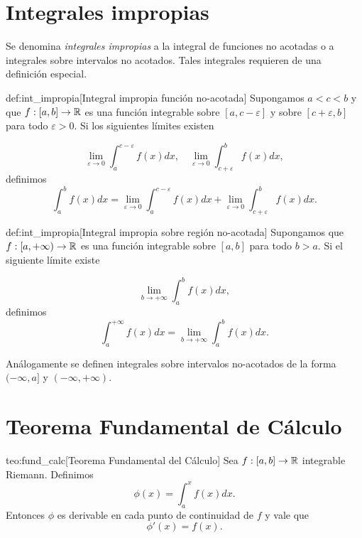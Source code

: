    
\section{Integrales impropias}
Se denomina \emph{integrales impropias} a la integral de funciones no acotadas o a integrales sobre intervalos no acotados. Tales integrales requieren de una definición especial.
\begin{definicion}{def:int_impropia}[Integral impropia función no-acotada] Supongamos $a<c<b$ y que $f:[a,b]\to\mathbb{R}$ es una función integrable sobre $[a,c-\varepsilon]$ y sobre $[c+\varepsilon,b]$ para todo $\varepsilon>0$. Si los siguientes límites existen

\[
 \lim_{\varepsilon\to 0}\int_a^{c-\varepsilon}f(x)dx,\quad \lim_{\varepsilon\to 0}\int_{c+\varepsilon}^bf(x)dx,
\]
definimos 
\begin{equation}\label{eq:int_impro}
 \int_a^bf(x)dx= \lim_{\varepsilon\to 0}\int_a^{c-\varepsilon}f(x)dx+ \lim_{\varepsilon\to 0}\int_{c+\varepsilon}^bf(x)dx.
\end{equation}



 
\end{definicion}

\begin{definicion}{def:int_impropia}[Integral impropia sobre región no-acotada] Supongamos  que $f:[a,+\infty)\to\mathbb{R}$ es una función integrable sobre $[a,b]$  para todo $b>a$. Si el siguiente límite existe

\[
 \lim_{b\to +\infty}\int_a^bf(x)dx,
\]
definimos 
\begin{equation}\label{eq:int_impro_inf}
 \int_a^{+\infty}f(x)dx= \lim_{b\to +\infty}\int_a^bf(x)dx.
\end{equation}

\end{definicion}

Análogamente se definen integrales sobre intervalos no-acotados de la forma $(-\infty, a]$ y $(-\infty,+\infty)$.



\section{Teorema Fundamental de Cálculo}


\begin{teorema}{teo:fund_calc}[Teorema Fundamental del Cálculo]
 Sea $f:[a,b]\to\mathbb{R}$ integrable Riemann. Definimos
 \begin{equation*}\label{eq:primi1}
  \phi(x)=\int_a^{x}f(x)dx.
 \end{equation*}
Entonces $\phi$ es derivable en cada punto de continuidad de $f$ y vale que
 \begin{equation}\label{eq:primi2}
  \phi'(x)=f(x).
 \end{equation}
\end{teorema}


